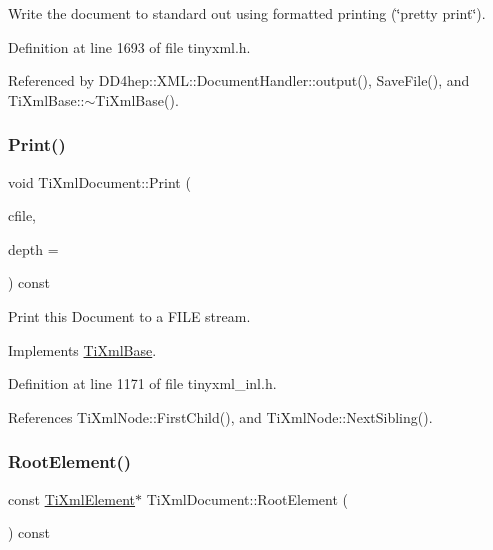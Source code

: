 Write the document to standard out using formatted printing (\char`\"{}pretty print\char`\"{}). 

Definition at line 1693 of file tinyxml.\+h.



Referenced by D\+D4hep\+::\+X\+M\+L\+::\+Document\+Handler\+::output(), Save\+File(), and Ti\+Xml\+Base\+::$\sim$\+Ti\+Xml\+Base().

\hypertarget{class_ti_xml_document_aa9e166fae51da603641380a964f21eeb}{}\label{class_ti_xml_document_aa9e166fae51da603641380a964f21eeb} 
\subsubsection{\texorpdfstring{Print()}{Print()}\hspace{0.1cm}{\footnotesize\ttfamily [2/2]}}
{\footnotesize\ttfamily void Ti\+Xml\+Document\+::\+Print (\begin{DoxyParamCaption}\item[{F\+I\+LE $\ast$}]{cfile,  }\item[{int}]{depth = {} }\end{DoxyParamCaption}) const\hspace{0.3cm}{\ttfamily [virtual]}}



Print this Document to a F\+I\+LE stream. 



Implements \hyperlink{class_ti_xml_base_a0de56b3f2ef14c65091a3b916437b512}{Ti\+Xml\+Base}.



Definition at line 1171 of file tinyxml\+\_\+inl.\+h.



References Ti\+Xml\+Node\+::\+First\+Child(), and Ti\+Xml\+Node\+::\+Next\+Sibling().

\hypertarget{class_ti_xml_document_ab54e3a93279fcf0ac80f06ed9c52f04a}{}\label{class_ti_xml_document_ab54e3a93279fcf0ac80f06ed9c52f04a} 
\subsubsection{\texorpdfstring{Root\+Element()}{RootElement()}\hspace{0.1cm}{\footnotesize\ttfamily [1/2]}}
{\footnotesize\ttfamily const \hyperlink{class_ti_xml_element}{Ti\+Xml\+Element}$\ast$ Ti\+Xml\+Document\+::\+Root\+Element (\begin{DoxyParamCaption}{ }\end{DoxyParamCaption}) const\hspace{0.3cm}{\ttfamily [inline]}}

